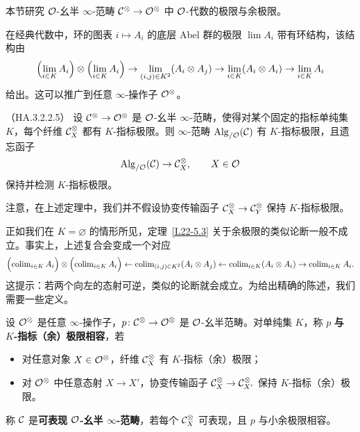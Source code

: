 \nitem\label{L22-5.1} 本节研究 $\mathcal{O}$-幺半 $\infty$-范畴 $\mathcal{C}^{\otimes}\to\mathcal{O}^{\otimes}$ 中 $\mathcal{O}$-代数的极限与余极限。

\nitem\label{L22-5.2} 在经典代数中，环的图表 $i\mapsto A_{i}$ 的底层 Abel 群的极限 $\lim A_{i}$ 带有环结构，该结构由
\[
\Bigl(\lim_{i\in K}A_{i}\Bigr)\otimes\Bigl(\lim_{i\in K}A_{i}\Bigr)\to\lim_{(i,j)\in K^{2}}(A_{i}\otimes A_{j})\to\lim_{i\in K}(A_{i}\otimes A_{i})\to\lim_{i\in K}A_{i}
\]
给出。这可以推广到任意 $\infty$-操作子 $\mathcal{O}^{\otimes}$。

\begin{theorem}\label{L22-5.3}（HA.3.2.2.5）
设 $\mathcal{C}^{\otimes}\to\mathcal{O}^{\otimes}$ 是 $\mathcal{O}$-幺半 $\infty$-范畴，使得对某个固定的指标单纯集 $K$，每个纤维 $\mathcal{C}^{\otimes}_{X}$ 都有 $K$-指标极限。则 $\infty$-范畴 $\operatorname{Alg}_{/\mathcal{O}}(\mathcal{C})$ 有 $K$-指标极限，且遗忘函子
\[
\operatorname{Alg}_{/\mathcal{O}}(\mathcal{C})\to\mathcal{C}^{\otimes}_{X},\qquad X\in\mathcal{O}
\]
保持并检测 $K$-指标极限。
\end{theorem}

\begin{remark}\label{L22-5.4}
注意，在上述定理中，我们并不假设协变传输函子 $\mathcal{C}^{\otimes}_{X}\to\mathcal{C}^{\otimes}_{Y}$ 保持 $K$-指标极限。
\end{remark}

\nitem\label{L22-5.5} 正如我们在 $K=\varnothing$ 的情形所见，定理~\ref{L22-5.3} 关于余极限的类似论断一般不成立。事实上，上述复合会变成一个对应
\[
\Bigl(\operatorname{colim}_{i\in K}A_{i}\Bigr)\otimes\Bigl(\operatorname{colim}_{i\in K}A_{i}\Bigr)\leftarrow\operatorname{colim}_{(i,j)\in K^{2}}(A_{i}\otimes A_{j})\leftarrow\operatorname{colim}_{i\in K}(A_{i}\otimes A_{i})\to\operatorname{colim}_{i\in K}A_{i}.
\]
这提示：若两个向左的态射可逆，类似的论断就会成立。为给出精确的陈述，我们需要一些定义。

\begin{definition}\label{L22-5.6}
设 $\mathcal{O}^{\otimes}$ 是任意 $\infty$-操作子，$p\colon\mathcal{C}^{\otimes}\to\mathcal{O}^{\otimes}$ 是 $\mathcal{O}$-幺半范畴。对单纯集 $K$，称 $p$ \textbf{与 $K$-指标（余）极限相容}，若
\begin{itemize}[leftmargin=2.2em,itemsep=0.1em]
\item 对任意对象 $X\in\mathcal{O}^{\otimes}$，纤维 $\mathcal{C}^{\otimes}_{X}$ 有 $K$-指标（余）极限；
\item 对 $\mathcal{O}^{\otimes}$ 中任意态射 $X\to X'$，协变传输函子 $\mathcal{C}^{\otimes}_{X}\to\mathcal{C}^{\otimes}_{X'}$ 保持 $K$-指标（余）极限。
\end{itemize}
称 $\mathcal{C}$ 是\textbf{可表现 $\mathcal{O}$-幺半 $\infty$-范畴}，若每个 $\mathcal{C}^{\otimes}_{X}$ 可表现，且 $p$ 与小余极限相容。
\end{definition}

